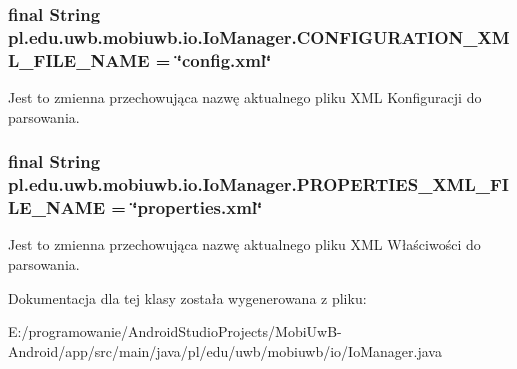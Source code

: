 \subsubsection[{C\+O\+N\+F\+I\+G\+U\+R\+A\+T\+I\+O\+N\+\_\+\+X\+M\+L\+\_\+\+F\+I\+L\+E\+\_\+\+N\+A\+M\+E}]{\setlength{\rightskip}{0pt plus 5cm}final String pl.\+edu.\+uwb.\+mobiuwb.\+io.\+Io\+Manager.\+C\+O\+N\+F\+I\+G\+U\+R\+A\+T\+I\+O\+N\+\_\+\+X\+M\+L\+\_\+\+F\+I\+L\+E\+\_\+\+N\+A\+M\+E = \char`\"{}config.\+xml\char`\"{}\hspace{0.3cm}{\ttfamily [static]}}\label{classpl_1_1edu_1_1uwb_1_1mobiuwb_1_1io_1_1_io_manager_a63ac59bc913302350eee7f52e99d087d}
Jest to zmienna przechowująca nazwę aktualnego pliku X\+M\+L Konfiguracji do parsowania. \hypertarget{classpl_1_1edu_1_1uwb_1_1mobiuwb_1_1io_1_1_io_manager_afe85a73ba16f0c4c6dcaa0f92278e567}{}
\subsubsection[{P\+R\+O\+P\+E\+R\+T\+I\+E\+S\+\_\+\+X\+M\+L\+\_\+\+F\+I\+L\+E\+\_\+\+N\+A\+M\+E}]{\setlength{\rightskip}{0pt plus 5cm}final String pl.\+edu.\+uwb.\+mobiuwb.\+io.\+Io\+Manager.\+P\+R\+O\+P\+E\+R\+T\+I\+E\+S\+\_\+\+X\+M\+L\+\_\+\+F\+I\+L\+E\+\_\+\+N\+A\+M\+E = \char`\"{}properties.\+xml\char`\"{}\hspace{0.3cm}{\ttfamily [static]}}\label{classpl_1_1edu_1_1uwb_1_1mobiuwb_1_1io_1_1_io_manager_afe85a73ba16f0c4c6dcaa0f92278e567}
Jest to zmienna przechowująca nazwę aktualnego pliku X\+M\+L Właściwości do parsowania. 

Dokumentacja dla tej klasy została wygenerowana z pliku\+:\begin{DoxyCompactItemize}
\item 
E\+:/programowanie/\+Android\+Studio\+Projects/\+Mobi\+Uw\+B-\/\+Android/app/src/main/java/pl/edu/uwb/mobiuwb/io/Io\+Manager.\+java\end{DoxyCompactItemize}

